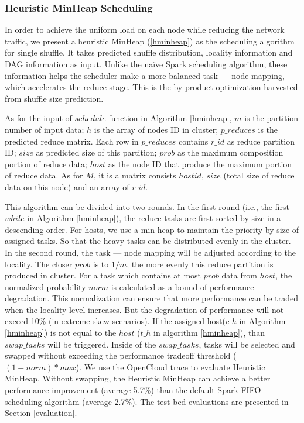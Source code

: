 \subsubsection{Heuristic MinHeap Scheduling}\label{h-minheap}
In order to achieve the uniform load on each node while reducing the network traffic, we present a heuristic MinHeap (\ref{hminheap}) as the scheduling algorithm for single shuffle. It takes predicted shuffle distribution, locality information and DAG information as input. Unlike the na\"{i}ve Spark scheduling algorithm, these information helps the scheduler make a more balanced task --- node mapping, which accelerates the reduce stage. This is the by-product optimization harvested from shuffle size prediction.

As for the input of $schedule$ function in Algorithm \ref{hminheap}, $m$ is the partition number of input data; $h$ is the array of nodes ID in cluster; $p\_reduces$ is the predicted reduce matrix. Each row in $p\_reduces$ contains $r\_id$ as reduce partition ID; $size$ as predicted size of this partition; $prob$ as the maximum composition portion of reduce data; $host$ as the node ID that produce the maximum portion of reduce data. As for $M$, it is a matrix consists $hostid$, $size$ (total size of reduce data on this node) and an array of $r\_id$.

This algorithm can be divided into two rounds. In the first round (i.e., the first $while$ in Algorithm \ref{hminheap}), the reduce tasks are first sorted by size in a descending order. For hosts, we use a min-heap to maintain the priority by size of assigned tasks. So that the heavy tasks can be distributed evenly in the cluster.
In the second round, the task --- node mapping will be adjusted according to the locality. The closer $prob$ is to $1/m$, the more evenly this reduce partition is produced in cluster. For a task which contains at most $prob$ data from $host$, the normalized probability $norm$ is calculated as a bound of performance degradation. This normalization can ensure that more performance can be traded when the locality level increases. But the degradation of performance will not exceed 10\% (in extreme skew scenarios). If the assigned host($c\_h$ in Algorithm \ref{hminheap}) is not equal to the $host$ ($t\_h$ in algorithm \ref{hminheap}), than $swap\_tasks$ will be triggered.
Inside of the $swap\_tasks$, tasks will be selected and swapped without exceeding the performance tradeoff threshold ($\left(1+norm\right)*max$). We use the OpenCloud \cite{opencloudtrace} trace to evaluate Heuristic MinHeap. Without swapping, the Heuristic MinHeap can achieve a better performance improvement (average 5.7\%) than the default Spark FIFO scheduling algorithm (average 2.7\%). The test bed evaluations are presented in Section \ref{evaluation}.

